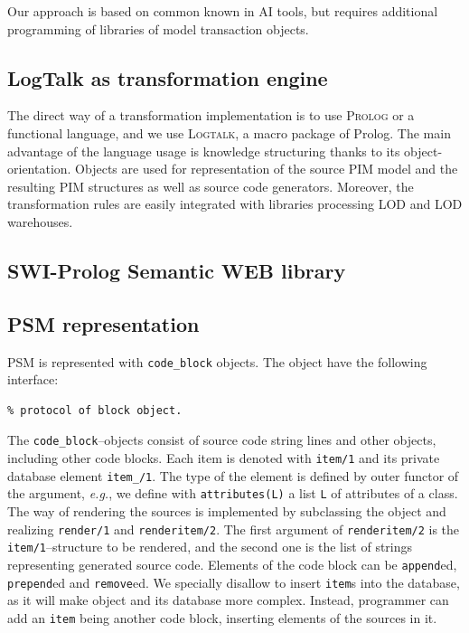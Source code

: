 \documentclass[12pt,a4paper]{llncs}
\begin{document}
Our approach is based on common known in AI tools, but requires additional programming of libraries of model transaction objects.

\subsection{LogTalk as transformation engine}
\label{sec:logtalk-engine}

The direct way of a transformation implementation is to use \textsc{Prolog} or a functional language, and we use \textsc{Logtalk}, a macro package of Prolog.  The main advantage of the language usage is knowledge structuring thanks to its object-orientation.  Objects are used for representation of the source PIM model and the resulting PIM structures as well as source code generators.  Moreover, the transformation rules are easily integrated with libraries processing LOD and LOD warehouses.


\subsection{SWI-Prolog Semantic WEB library}
\label{sec:swi-sw}

\subsection{PSM representation}
\label{sec:blocks}

PSM is represented with \texttt{code\_block} objects.  The object have the following interface:
\begin{verbatim}
% protocol of block object.
\end{verbatim}

The \verb|code_block|--objects consist of source code string lines and other objects, including other code blocks. Each item is denoted with \verb|item/1| and its private database element \verb|item_/1|.  The type of the element is defined by outer functor of the argument, \emph{e.g.}, we define with \verb|attributes(L)| a list \verb|L| of attributes of a class.  The way of rendering the sources is implemented by subclassing the object and realizing \verb|render/1| and \verb|renderitem/2|.  The first argument of \verb|renderitem/2| is the \verb|item/1|--structure to be rendered, and the second one is the list of strings representing generated source code.  Elements of the code block can be \verb|append|ed, \verb|prepend|ed and \verb|remove|ed.  We specially disallow to insert \verb|item|s into the database, as it will make object and its database more complex.  Instead, programmer can add an \verb|item| being another code block, inserting elements of the sources in it.
\end{document}
